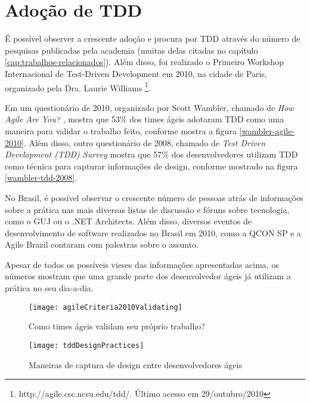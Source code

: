 \section{Adoção de TDD}

É possível observer a crescente adoção e procura por TDD através do número de
pesquisas publicadas pela academia (muitas delas citadas no capítulo 
\ref{cap:trabalhos-relacionados}). Além disso, foi realizado o Primeiro Workshop
Internacional de Test-Driven Development em 2010, na cidade de Paris, organizado
pela Dra. Laurie Williams \footnote{http://agile.csc.ncsu.edu/tdd/. Último acesso em 29/outubro/2010}.

Em um questionário de 2010, organizado por Scott Wambler, chamado de \textit{How
Agile Are You?} \cite{wambler-survey-agile}, mostra que 53\% dos times ágeis
adotaram TDD como uma maneira para validar o trabalho feito, conforme mostra a 
figura \ref{wambler-agile-2010}. Além disso, outro questionário de 2008, 
chamado de \textit{Test Driven Development (TDD) Survey}
\cite{wambler-survey-tdd}  mostra que 57\% dos desenvolvedores utilizam TDD como
técnica para capturar informações de design, conforme mostrado na figura 
\ref{wambler-tdd-2008}. 

No Brasil, é possível observar o crescente número de pessoas atrás de
informações sobre a prática nas mais diversas listas de discussão e fóruns sobre
tecnologia, como o GUJ ou o .NET Architects. Além disso, diversos eventos de
desenvolvimento de software realizados no Brasil em 2010, como a QCON SP e a
Agile Brazil contaram com palestras sobre o assunto. 

Apesar de todos os possíveis vieses das informações apresentadas acima, os
números mostram que uma grande parte dos desenvolvedor ágeis já utilizam a 
prática no seu dia-a-dia.

\begin{figure}[h]
  \centering
  \texttt{[image: agileCriteria2010Validating]}
  \caption{Como times ágeis validam seu próprio trabalho?}
  \label{fig:wambler-agile-2010}
\end{figure}

\begin{figure}[h]
  \centering
  \texttt{[image: tddDesignPractices]}
  \caption{Maneiras de captura de design entre desenvolvedores ágeis}   
  \label{fig:wambler-tdd-2008}
\end{figure}
